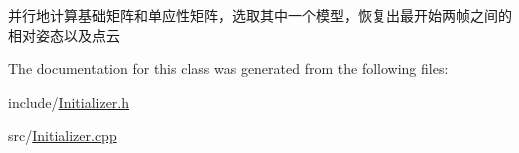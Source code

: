 并行地计算基础矩阵和单应性矩阵，选取其中一个模型，恢复出最开始两帧之间的相对姿态以及点云 



The documentation for this class was generated from the following files\+:\begin{DoxyCompactItemize}
\item 
include/\mbox{\hyperlink{_initializer_8h}{Initializer.\+h}}\item 
src/\mbox{\hyperlink{_initializer_8cpp}{Initializer.\+cpp}}\end{DoxyCompactItemize}
